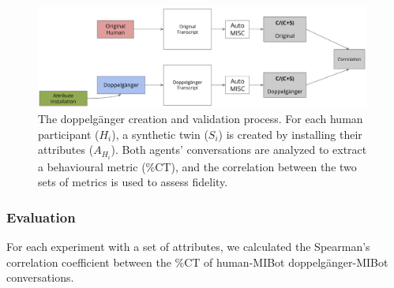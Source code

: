 \begin{figure}[htpb]
    \centering
    \includegraphics[width=0.98\textwidth]{fig/doppelganger_process.png}
    \caption{The doppelgänger creation and validation process. For each human participant ($H_i$), a synthetic twin ($S_i$) is created by installing their attributes ($A_{H_i}$). Both agents' conversations are analyzed to extract a behavioural metric (\%CT), and the correlation between the two sets of metrics is used to assess fidelity.}
    \label{fig:doppelgänger-creation-process}
\end{figure}


\subsubsection{Evaluation}
For each experiment with a set of attributes, we calculated the Spearman's correlation coefficient between the \%CT of human-MIBot doppelgänger-MIBot conversations.


